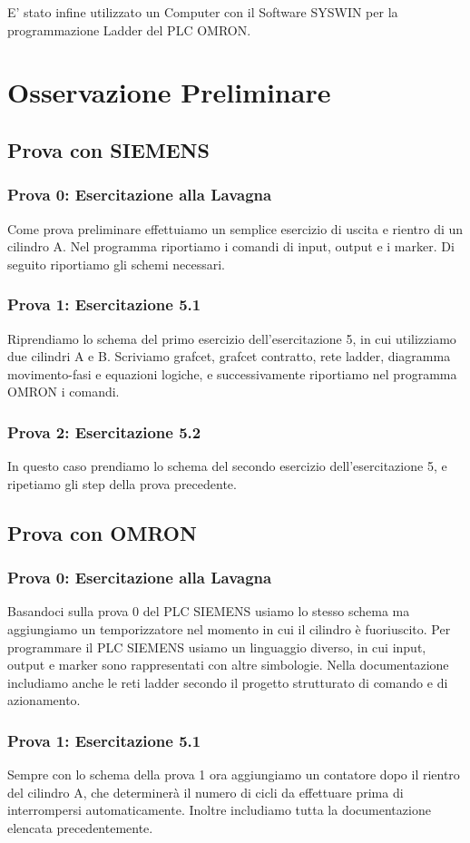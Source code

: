 \documentclass[a4paper]{article}
\begin{document}
E' stato infine utilizzato un Computer con il Software SYSWIN per la programmazione Ladder del PLC OMRON.

\section{Osservazione Preliminare}
\subsection{Prova con SIEMENS}
\subsubsection{Prova 0: Esercitazione alla Lavagna}
Come prova preliminare effettuiamo un semplice esercizio di uscita e rientro di un cilindro A. Nel programma riportiamo i comandi di input, output e i marker. Di seguito riportiamo gli schemi necessari.
\subsubsection{Prova 1: Esercitazione 5.1}
Riprendiamo lo schema del primo esercizio dell’esercitazione 5, in cui utilizziamo due cilindri A e B. Scriviamo grafcet, grafcet contratto, rete ladder, diagramma movimento-fasi e equazioni logiche, e successivamente riportiamo nel programma OMRON i comandi.
\subsubsection{Prova 2: Esercitazione 5.2}
In questo caso prendiamo lo schema del secondo esercizio dell’esercitazione 5, e ripetiamo gli step della prova precedente.
\subsection{Prova con OMRON}
\subsubsection{Prova 0: Esercitazione alla Lavagna}
Basandoci sulla prova 0 del PLC SIEMENS usiamo lo stesso schema ma aggiungiamo un temporizzatore nel momento in cui il cilindro è fuoriuscito. Per programmare il PLC SIEMENS usiamo un linguaggio diverso, in cui input, output e marker sono rappresentati con altre simbologie. Nella documentazione includiamo anche le reti ladder secondo il progetto strutturato di comando e di azionamento.
\subsubsection{Prova 1: Esercitazione 5.1}
Sempre con lo schema della prova 1 ora aggiungiamo un contatore dopo il rientro del cilindro A, che determinerà il numero di cicli da effettuare prima di interrompersi automaticamente. Inoltre includiamo tutta la documentazione elencata precedentemente.
\end{document}
